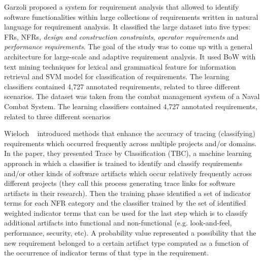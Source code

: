	Garzoli \cite {Garzoli:2013} proposed a system for requirement analysis that allowed to identify software functionalities within large collections of requirements written in natural language for requirement analysis. It classified the large dataset into five types:
FRs, NFRs, \emph{design and construction constraints}, \emph{operator
requirements} and \emph{performance requirements}.  The goal of the study was to come up with a general
architecture for large-scale and adaptive requirement analysis. It used BoW with text mining techniques for lexical and grammatical feature for information retrieval and SVM model for classification of requirements. The learning classifiers contained 4,727 annotated requirements, related
to three different scenarios. The dataset was taken from
the combat management system of a Naval Combat System. The learning classifiers contained 4,727 annotated requirements, related
to three different scenarios

	Wieloch \etal~\cite{Wieloch:2013} introduced methods that enhance the accuracy
of tracing (classifying) requirements which occurred frequently across multiple
projects and/or domains. In the paper, they presented Trace by Classification
(TBC), a machine learning approach in which a classifier is trained to identify
and classify requirements and/or other kinds of software artifacts which occur
relatively frequently across different projects (they call this process
generating trace links for software artifacts in their research).  Then the training phase identified a set of indicator
terms for each NFR category and the classifier trained by the
set of identified weighted indicator terms that can be used for the last step which is to classify additional
artifacts into functional and non-functional (e.g.
look-and-feel, performance, security, etc). A probability value represented 
a possibility that the new requirement belonged to a certain artifact type computed as a function of the occurrence of indicator terms of that type in the requirement. 
 

